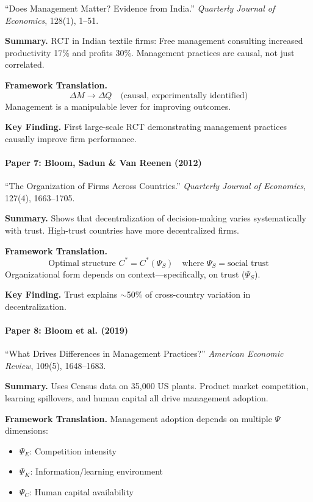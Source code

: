 ``Does Management Matter? Evidence from India.''
\textit{Quarterly Journal of Economics}, 128(1), 1--51.

\textbf{Summary.}
RCT in Indian textile firms: Free management consulting increased productivity 17\%
and profits 30\%. Management practices are causal, not just correlated.

\textbf{Framework Translation.}
\begin{equation}
  \Delta M \rightarrow \Delta Q \quad \text{(causal, experimentally identified)}
\end{equation}
Management is a manipulable lever for improving outcomes.

\textbf{Key Finding.}
First large-scale RCT demonstrating management practices causally improve firm performance.

\paragraph{Paper 7: Bloom, Sadun \& Van Reenen (2012)}

``The Organization of Firms Across Countries.''
\textit{Quarterly Journal of Economics}, 127(4), 1663--1705.

\textbf{Summary.}
Shows that decentralization of decision-making varies systematically with trust.
High-trust countries have more decentralized firms.

\textbf{Framework Translation.}
\begin{equation}
  \text{Optimal structure } C^* = C^*(\Psi_S) \quad \text{where } \Psi_S = \text{social trust}
\end{equation}
Organizational form depends on context---specifically, on trust ($\Psi_S$).

\textbf{Key Finding.}
Trust explains $\sim$50\% of cross-country variation in decentralization.

\paragraph{Paper 8: Bloom et al. (2019)}

``What Drives Differences in Management Practices?''
\textit{American Economic Review}, 109(5), 1648--1683.

\textbf{Summary.}
Uses Census data on 35,000 US plants. Product market competition, learning spillovers,
and human capital all drive management adoption.

\textbf{Framework Translation.}
Management adoption depends on multiple $\Psi$ dimensions:
\begin{itemize}
  \item $\Psi_E$: Competition intensity
  \item $\Psi_K$: Information/learning environment
  \item $\Psi_C$: Human capital availability
\end{itemize}

